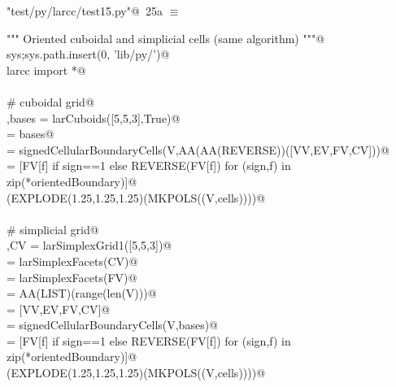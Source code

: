 \documentclass[11pt,oneside]{article}	%
\begin{document}
\begin{flushleft} \small \label{scrap43}
\protect{}\verb@"test/py/larcc/test15.py"@\nobreak\ {\footnotesize 25a }$\equiv$
\vspace{-1ex}
\begin{list}{}{} \item
\mbox{}\verb@""" Oriented cuboidal and simplicial cells (same algorithm) """@\\
\mbox{}\verb@import sys;sys.path.insert(0, 'lib/py/')@\\
\mbox{}\verb@from larcc import *@\\
\mbox{}\verb@@\\
\mbox{}\verb@# cuboidal grid@\\
\mbox{}\verb@V,bases = larCuboids([5,5,3],True)@\\
\mbox{}\verb@[VV,EV,FV,CV] = bases@\\
\mbox{}\verb@orientedBoundary = signedCellularBoundaryCells(V,AA(AA(REVERSE))([VV,EV,FV,CV]))@\\
\mbox{}\verb@cells = [FV[f] if sign==1 else REVERSE(FV[f])  for (sign,f) in zip(*orientedBoundary)]@\\
\mbox{}\verb@VIEW(EXPLODE(1.25,1.25,1.25)(MKPOLS((V,cells))))@\\
\mbox{}\verb@@\\
\mbox{}\verb@# simplicial grid@\\
\mbox{}\verb@V,CV = larSimplexGrid1([5,5,3])@\\
\mbox{}\verb@FV = larSimplexFacets(CV)@\\
\mbox{}\verb@EV = larSimplexFacets(FV)@\\
\mbox{}\verb@VV = AA(LIST)(range(len(V)))@\\
\mbox{}\verb@bases = [VV,EV,FV,CV]@\\
\mbox{}\verb@orientedBoundary = signedCellularBoundaryCells(V,bases)@\\
\mbox{}\verb@cells = [FV[f] if sign==1 else REVERSE(FV[f])  for (sign,f) in zip(*orientedBoundary)]@\\
\mbox{}\verb@VIEW(EXPLODE(1.25,1.25,1.25)(MKPOLS((V,cells))))@\\
\mbox{}\verb@@{\NWsep}
\end{list}
\vspace{-2ex}
\end{flushleft}
\end{document}

